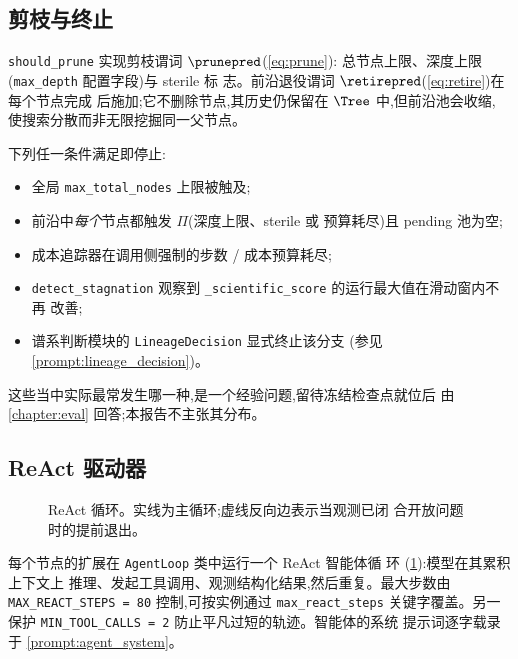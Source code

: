 \subsection{剪枝与终止}\label{sec:exploration:termination}

\texttt{should\_prune} 实现剪枝谓词 $\prunepred$(\cref{eq:prune}):
总节点上限、深度上限(\texttt{max\_depth} 配置字段)与 sterile 标
志。前沿退役谓词 $\retirepred$(\cref{eq:retire})在每个节点完成
后施加;它不删除节点,其历史仍保留在 $\Tree$ 中,但前沿池会收缩,
使搜索分散而非无限挖掘同一父节点。

下列任一条件满足即停止:

\begin{itemize}
  \item 全局 \texttt{max\_total\_nodes} 上限被触及;
  \item 前沿中\emph{每个}节点都触发 $\Pi$(深度上限、sterile 或
        预算耗尽)且 pending 池为空;
  \item 成本追踪器在调用侧强制的步数 / 成本预算耗尽;
  \item {} \texttt{detect\_stagnation} 观察到
        \texttt{\_scientific\_score} 的运行最大值在滑动窗内不再
        改善;
  \item 谱系判断模块的 \texttt{LineageDecision} 显式终止该分支
        (参见 \cref{prompt:lineage_decision})。
\end{itemize}

这些当中实际最常发生哪一种,是一个经验问题,留待冻结检查点就位后
由 \cref{chapter:eval} 回答;本报告不主张其分布。

\subsection{ReAct 驱动器}\label{sec:exploration:react}

\begin{figure}[t]
  \centering
  \resizebox{\columnwidth}{!}{}
  \caption{ReAct 循环。实线为主循环;虚线反向边表示当观测已闭
           合开放问题时的提前退出。}
  \label{fig:react}
\end{figure}

每个节点的扩展在 \texttt{AgentLoop} 类中运行一个 ReAct 智能体循
环 \cite{yao2023react}(\cref{fig:react}):模型在其累积上下文上
推理、发起工具调用、观测结构化结果,然后重复。最大步数由
\texttt{MAX\_REACT\_STEPS = 80} 控制,可按实例通过
\texttt{max\_react\_steps} 关键字覆盖。另一保护
\texttt{MIN\_TOOL\_CALLS = 2} 防止平凡过短的轨迹。智能体的系统
提示词逐字载录于 \cref{prompt:agent_system}。

